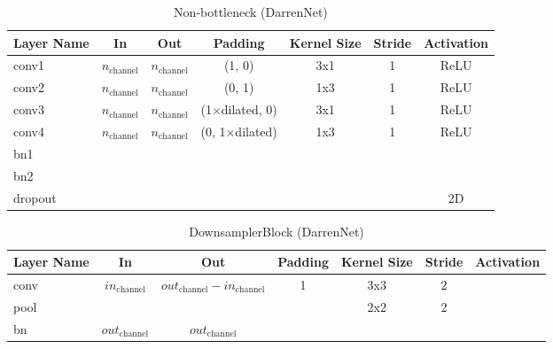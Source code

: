 \begin{table}[H]
	\setlength{\abovecaptionskip}{10pt}
	\centering
	\begin{tabular}{|l|c|c|c|c|c|c|}
		\hline
		\textbf{Layer Name} & \textbf{In}          & \textbf{Out}         & \textbf{Padding}      & \textbf{Kernel Size} & \textbf{Stride} & \textbf{Activation} \\
		\hline
		conv1          & $n_{\text{channel}}$ & $n_{\text{channel}}$ & (1, 0)                & 3x1               & 1               & ReLU                \\
		\hline
		conv2          & $n_{\text{channel}}$ & $n_{\text{channel}}$ & (0, 1)                & 1x3               & 1               & ReLU                \\
		\hline
		conv3          & $n_{\text{channel}}$ & $n_{\text{channel}}$ & (1$\times$dilated, 0) & 3x1               & 1               & ReLU                \\
		\hline
		conv4          & $n_{\text{channel}}$ & $n_{\text{channel}}$ & (0, 1$\times$dilated) & 1x3               & 1               & ReLU                \\
		\hline
		bn1                 &                      &                      &                       &                      &                 &                     \\
		\hline
		bn2                 &                      &                      &                       &                      &                 &                     \\
		\hline
		dropout             &                      &                      &                       &                      &                 & 2D                  \\
		\hline
	\end{tabular}
	\caption{Non-bottleneck (DarrenNet)}
\end{table}

\begin{table}[H]
	\setlength{\abovecaptionskip}{10pt}
	\centering
	\begin{tabular}{|l|c|c|c|c|c|c|}
		\hline
		\textbf{Layer Name} & \textbf{In}            & \textbf{Out}                                 & \textbf{Padding} & \textbf{Kernel Size} & \textbf{Stride} & \textbf{Activation} \\
		\hline
		conv                & $in_{\text{channel}}$  & $out_{\text{channel}} - in_{\text{channel}}$ & 1           & 3x3               & 2               &                    \\
		\hline
		pool                &                       &                                             &                 & 2x2               & 2               &                    \\
		\hline
		bn                  & $out_{\text{channel}}$ & $out_{\text{channel}}$                       &                 &                     &                &                    \\
		\hline
	\end{tabular}
	\caption{DownsamplerBlock (DarrenNet)}
\end{table}

